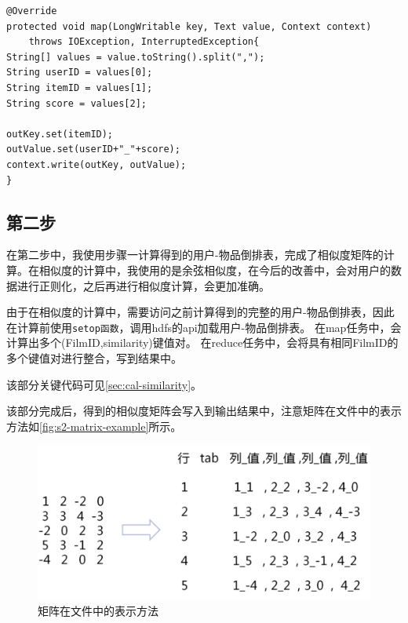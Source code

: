 \documentclass[forprint]{myreport}
\begin{document}
\begin{lstlisting}[style = c]
@Override
protected void map(LongWritable key, Text value, Context context) 
    throws IOException, InterruptedException{
String[] values = value.toString().split(",");
String userID = values[0];
String itemID = values[1];
String score = values[2];

outKey.set(itemID);
outValue.set(userID+"_"+score);
context.write(outKey, outValue);
}
\end{lstlisting}



\subsection{第二步}

在第二步中，我使用步骤一计算得到的用户-物品倒排表，完成了相似度矩阵的计算。在相似度的计算中，我使用的是余弦相似度，在今后的改善中，会对用户的数据进行正则化，之后再进行相似度计算，会更加准确。

由于在相似度的计算中，需要访问之前计算得到的完整的用户-物品倒排表，因此在计算前使用\texttt{setop函数}，调用hdfs的api加载用户-物品倒排表。
在map任务中，会计算出多个(FilmID,similarity)键值对。
在reduce任务中，会将具有相同FilmID的多个键值对进行整合，写到结果中。

该部分关键代码可见\autoref{sec:cal-similarity}。

该部分完成后，得到的相似度矩阵会写入到输出结果中，注意矩阵在文件中的表示方法如\autoref{fig:s2-matrix-example}所示。


\begin{figure}[htp]
  \centering
  \includegraphics[width=13cm]{./figure/2018-07-04-10-59-17.png}
  \caption{矩阵在文件中的表示方法}
  \label{fig:s2-matrix-example}
\end{figure}
\end{document}
